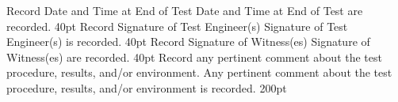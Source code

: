 
%
\tpStep%
{Record Date and Time at End of Test}
{Date and Time at End of Test are recorded.}
{40pt}
%
\tpStep%
{Record Signature of Test Engineer(s)}
{Signature of Test Engineer(s) is recorded.}
{40pt}
%
\tpStep%
{Record Signature of Witness(es)}
{Signature of Witness(es) are recorded.}
{40pt}
%
\tpStep%
{Record any pertinent comment about the test procedure, results, and/or environment.}
{Any pertinent comment about the test procedure, results, and/or environment is recorded.}
{200pt}
%
